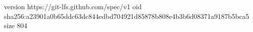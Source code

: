 version https://git-lfs.github.com/spec/v1
oid sha256:a23901a0b65ddc63dc844edbd704921d85878b808e4b3b6d08371a9187b5bca5
size 804
